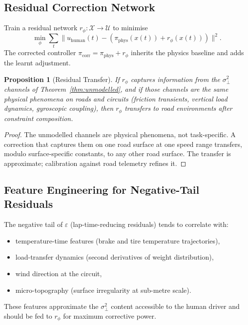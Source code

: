 \documentclass[11pt,twocolumn]{article}
\newtheorem{proposition}[theorem]{Proposition}
\theoremstyle{definition}
\theoremstyle{remark}
\newcommand{\cX}{\mathcal{X}}
\newcommand{\cU}{\mathcal{U}}
\begin{document}
\subsection{Residual Correction Network}

Train a residual network $r_\phi: \cX \to \cU$ to minimise
\begin{equation}
\min_\phi \sum_t \|u_{\mathrm{human}}(t) - (\pi_{\mathrm{phys}}(x(t)) + r_\phi(x(t)))\|^2.
\end{equation}
The corrected controller $\pi_{\mathrm{corr}} = \pi_{\mathrm{phys}} + r_\phi$ inherits the physics baseline and adds the learnt adjustment.

\begin{proposition}[Residual Transfer]\label{prop:residual-transfer}
If $r_\phi$ captures information from the $\sigma^2_{\perp}$ channels of Theorem~\ref{thm:unmodelled}, and if those channels are the same physical phenomena on roads and circuits (friction transients, vertical load dynamics, gyroscopic coupling), then $r_\phi$ transfers to road environments after constraint composition.
\end{proposition}

\begin{proof}
The unmodelled channels are physical phenomena, not task-specific. A correction that captures them on one road surface at one speed range transfers, modulo surface-specific constants, to any other road surface. The transfer is approximate; calibration against road telemetry refines it.
\end{proof}

\subsection{Feature Engineering for Negative-Tail Residuals}

The negative tail of $\varepsilon$ (lap-time-reducing residuals) tends to correlate with:
\begin{itemize}[leftmargin=*,itemsep=2pt]
\item temperature-time features (brake and tire temperature trajectories),
\item load-transfer dynamics (second derivatives of weight distribution),
\item wind direction at the circuit,
\item micro-topography (surface irregularity at sub-metre scale).
\end{itemize}

These features approximate the $\sigma^2_{\perp}$ content accessible to the human driver and should be fed to $r_\phi$ for maximum corrective power.
\end{document}
